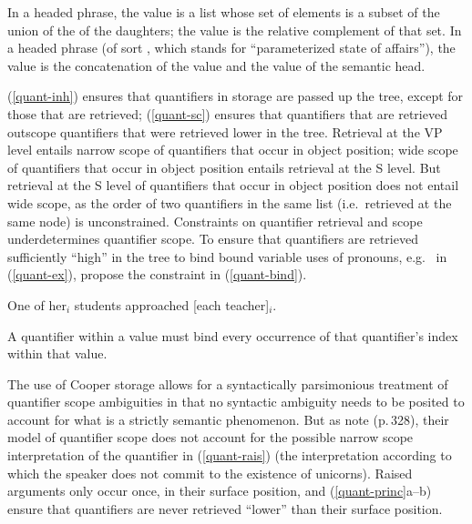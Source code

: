 \documentclass[output=paper
 	        ,biblatex
                ,babelshorthands
                ,newtxmath
                ,draftmode
                ,colorlinks, citecolor=brown
]{langscibook}
\begin{document}
\eal \label{quant-princ}
\ex\label{quant-inh}
In a headed phrase, the  value is a list whose set of elements is a subset of the union of the  of the daughters; the  value is the relative complement of that set.
\ex\label{quant-sc}
In a headed phrase (of sort , which stands for ``parameterized state of affairs''), the  value is the concatenation of the  value and the  value of the semantic head.
\zl

\noindent
(\ref{quant-inh}) ensures that quantifiers in storage are passed up the tree, except for those that are retrieved; (\ref{quant-sc}) ensures that quantifiers that are retrieved outscope quantifiers that were retrieved lower in the tree. Retrieval at the VP level entails narrow scope of quantifiers that occur in object position; wide scope of quantifiers that occur in object position entails retrieval at the S level. But retrieval at the S level of quantifiers that occur in object position does not entail wide scope, as the order of two quantifiers in the same  list (i.e.\ retrieved at the same node) is unconstrained. Constraints on quantifier retrieval and scope underdetermines quantifier scope. To ensure that quantifiers are retrieved sufficiently ``high'' in the tree to bind bound variable uses of pronouns, e.g.\  in (\ref{quant-ex}), \citeauthor{PollardandSag1994} propose the constraint in (\ref{quant-bind}).

\begin{exe}
\ex\label{quant-ex}
One of her$_{i}$ students approached [each teacher]$_{i}$. \citep[327]{PollardandSag1994}
\end{exe}

\begin{exe}
\ex\label{quant-bind}A quantifier within a  value must bind every occurrence of that quantifier's index within that  value.  
\end{exe}

The use of Cooper storage allows for a syntactically parsimonious treatment of quantifier scope ambiguities in that no syntactic ambiguity needs to be posited to account for what is a strictly semantic phenomenon. But as \citeauthor{PollardandSag1994} note (p.\,328), their model of quantifier scope does not account for the possible narrow scope interpretation of the quantifier  in (\ref{quant-rais}) (the interpretation according to which the speaker does not commit to the existence of unicorns). Raised arguments only occur once, in their surface position, and (\ref{quant-princ}a--b) ensure that quantifiers are never retrieved ``lower'' than their surface position.
\end{document}
